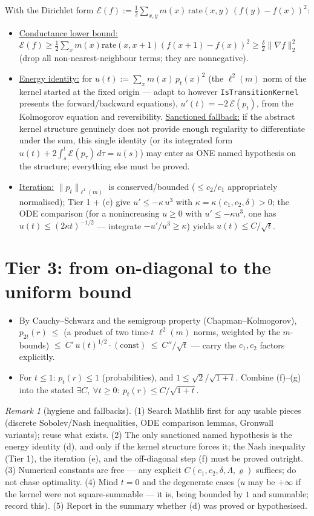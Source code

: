 \documentclass[11pt]{article}
\theoremstyle{plain}
\theoremstyle{remark}
\newtheorem{remark}{Remark}
\newcommand{\ee}{\mathcal E}\newcommand{\norm}[1]{\lVert #1\rVert}
\begin{document}
With the Dirichlet form
$\ee(f):=\tfrac12\sum_{x,y}m(x)\,\mathrm{rate}(x,y)\,(f(y)-f(x))^2$:
\begin{itemize}
\item[(c)] \underline{Conductance lower bound:}
$\ee(f)\ge\tfrac12\sum_x m(x)\mathrm{rate}(x,x{+}1)(f(x{+}1)-f(x))^2
\ge\tfrac\delta2\norm{\nabla f}_2^2$ (drop all non-nearest-neighbour terms;
they are nonnegative).
\item[(d)] \underline{Energy identity:} for $u(t):=\sum_x m(x)\,p_t(x)^2$
(the $\ell^2(m)$ norm of the kernel started at the fixed origin --- adapt to
however \texttt{IsTransitionKernel} presents the forward/backward equations),
$u'(t)=-2\,\ee(p_t)$, from the Kolmogorov equation and reversibility.
\underline{Sanctioned fallback:} if the abstract kernel structure genuinely does
not provide enough regularity to differentiate under the sum, this single
identity (or its integrated form
$u(t)+2\int_s^t\ee(p_\tau)\,d\tau=u(s)$) may enter as ONE named hypothesis on
the structure; everything else must be proved.
\item[(e)] \underline{Iteration:} $\norm{p_t}_{\ell^1(m)}$ is conserved/bounded
($\le c_2/c_1$ appropriately normalised); Tier 1 + (c) give
$u'\le-\kappa\,u^3$ with $\kappa=\kappa(c_1,c_2,\delta)>0$; the ODE comparison
(for a nonincreasing $u\ge0$ with $u'\le-\kappa u^3$, one has
$u(t)\le(2\kappa t)^{-1/2}$ --- integrate $-u'/u^3\ge\kappa$) yields
$u(t)\le C/\sqrt t$.
\end{itemize}

\section*{Tier 3: from on-diagonal to the uniform bound}

\begin{itemize}
\item[(f)] By Cauchy--Schwarz and the semigroup property (Chapman--Kolmogorov),
$p_{2t}(r)\ \le$ (a product of two time-$t$ $\ell^2(m)$ norms, weighted by the
$m$-bounds) $\le\ C'\,u(t)^{1/2}\cdot(\text{const})\ \le\ C''/\sqrt t$ ---
carry the $c_1,c_2$ factors explicitly.
\item[(g)] For $t\le1$: $p_t(r)\le1$ (probabilities), and
$1\le\sqrt2/\sqrt{1+t}$. Combine (f)--(g) into the stated
$\exists C,\ \forall t\ge0:\ p_t(r)\le C/\sqrt{1+t}$.
\end{itemize}

\begin{remark}[hygiene and fallbacks]
(1) Search Mathlib first for any usable pieces (discrete Sobolev/Nash
inequalities, ODE comparison lemmas, Gronwall variants); reuse what exists.
(2) The only sanctioned named hypothesis is the energy identity (d), and only
if the kernel structure forces it; the Nash inequality (Tier 1), the
iteration (e), and the off-diagonal step (f) must be proved outright.
(3) Numerical constants are free --- any explicit $C(c_1,c_2,\delta,\Lambda,\varrho)$
suffices; do not chase optimality.
(4) Mind $t=0$ and the degenerate cases ($u$ may be $+\infty$ if the kernel
were not square-summable --- it is, being bounded by $1$ and summable; record
this).
(5) Report in the summary whether (d) was proved or hypothesised.
\end{remark}
\end{document}
